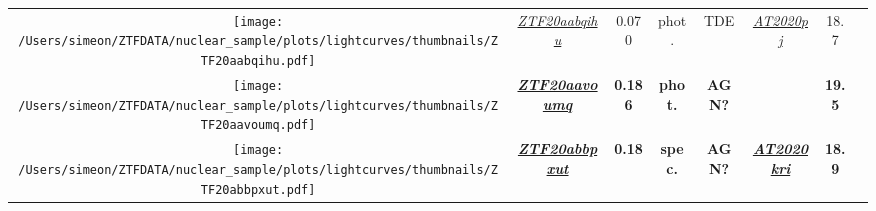 \begin{table*}
{\begin{tabular}{c c  c  c  c   c  c  c}
      \parbox[c]{12em}{\texttt{[image: /Users/simeon/ZTFDATA/nuclear\_sample/plots/lightcurves/thumbnails/ZTF20aabqihu.pdf]}}                                                                                                                                      & \textit{\href{https://ztfnuclear.simeonreusch.com/transient/ZTF20aabqihu}{ZTF20aabqihu}}          & 0.070                    & phot.                   & TDE               &
      \textit{\href{https://www.wis-tns.org/object/2020pj}{AT2020pj}}                                                                             & 18.7                                                                                              &                                                                                                                                                 \\
      \parbox[c]{12em}{\texttt{[image: /Users/simeon/ZTFDATA/nuclear\_sample/plots/lightcurves/thumbnails/ZTF20aavoumq.pdf]}}                                                                                                                                  & \textbf{\textit{\href{https://ztfnuclear.simeonreusch.com/transient/ZTF20aavoumq}{ZTF20aavoumq}}} & \textbf{0.186}           & \textbf{phot.}          &
      \textbf{AGN?}                                                                                                                               & ~                                                                                                 & \textbf{19.5}            &                                                                                                                      \\
      \parbox[c]{12em}{\texttt{[image: /Users/simeon/ZTFDATA/nuclear\_sample/plots/lightcurves/thumbnails/ZTF20abbpxut.pdf]}}                                                                                                                                    & \textbf{\textit{\href{https://ztfnuclear.simeonreusch.com/transient/ZTF20abbpxut}{ZTF20abbpxut}}} & \textbf{0.18}            & \textbf{spec.}          & \textbf{AGN?}     &
      \textbf{\textit{\href{https://www.wis-tns.org/object/2020kri}{AT2020kri}}}                                                                  & \textbf{18.9}                                                                                     &                                                                                                                                                 \\

\end{tabular}}
\end{table*}
